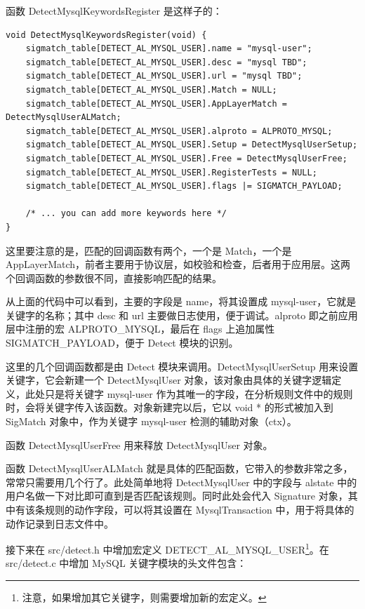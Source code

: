 函数 {\cf DetectMysqlKeywordsRegister} 是这样子的：

\begin{lstlisting}
void DetectMysqlKeywordsRegister(void) {
	sigmatch_table[DETECT_AL_MYSQL_USER].name = "mysql-user";
	sigmatch_table[DETECT_AL_MYSQL_USER].desc = "mysql TBD";
	sigmatch_table[DETECT_AL_MYSQL_USER].url = "mysql TBD";
	sigmatch_table[DETECT_AL_MYSQL_USER].Match = NULL;
	sigmatch_table[DETECT_AL_MYSQL_USER].AppLayerMatch = DetectMysqlUserALMatch;
	sigmatch_table[DETECT_AL_MYSQL_USER].alproto = ALPROTO_MYSQL; 
	sigmatch_table[DETECT_AL_MYSQL_USER].Setup = DetectMysqlUserSetup;
	sigmatch_table[DETECT_AL_MYSQL_USER].Free = DetectMysqlUserFree;
	sigmatch_table[DETECT_AL_MYSQL_USER].RegisterTests = NULL;
	sigmatch_table[DETECT_AL_MYSQL_USER].flags |= SIGMATCH_PAYLOAD;

	/* ... you can add more keywords here */
}
\end{lstlisting}

这里要注意的是，匹配的回调函数有两个，一个是 {\cf Match}，一个是 {\cf AppLayerMatch}，前者主要用于协议层，如校验和检查，后者用于应用层。这两个回调函数的参数很不同，直接影响匹配的结果。

从上面的代码中可以看到，主要的字段是 {\cf name}，将其设置成 {\cf mysql-user}，它就是关键字的名称；其中 {\cf desc} 和 {\cf url} 主要做日志使用，便于调试。{\cf alproto} 即之前应用层中注册的宏 {\cf ALPROTO\_MYSQL}，最后在 {\cf flags} 上追加属性 {\cf SIGMATCH\_PAYLOAD}，便于 Detect 模块的识别。

这里的几个回调函数都是由 Detect 模块来调用。{\cf DetectMysqlUserSetup} 用来设置关键字，它会新建一个 {\cf DetectMysqlUser} 对象，该对象由具体的关键字逻辑定义，此处只是将关键字 {\cf mysql-user} 作为其唯一的字段，在分析规则文件中的规则时，会将关键字传入该函数。对象新建完以后，它以 {\cf void *} 的形式被加入到 {\cf SigMatch} 对象中，作为关键字 {\cf mysql-user} 检测的辅助对象（{\cf ctx}）。

函数 {\cf DetectMysqlUserFree} 用来释放 {\cf DetectMysqlUser} 对象。

函数 {\cf DetectMysqlUserALMatch} 就是具体的匹配函数，它带入的参数非常之多，常常只需要用几个行了。此处简单地将 {\cf DetectMysqlUser} 中的字段与 {\cf alstate} 中的用户名做一下对比即可直到是否匹配该规则。同时此处会代入 {\cf Signature} 对象，其中有该条规则的动作字段，可以将其设置在 {\cf MysqlTransaction} 中，用于将具体的动作记录到日志文件中。

接下来在 {\ff src/detect.h} 中增加宏定义 {\cf DETECT\_AL\_MYSQL\_USER}\footnote{注意，如果增加其它关键字，则需要增加新的宏定义。}。在 {\ff src/detect.c} 中增加 MySQL 关键字模块的头文件包含：

